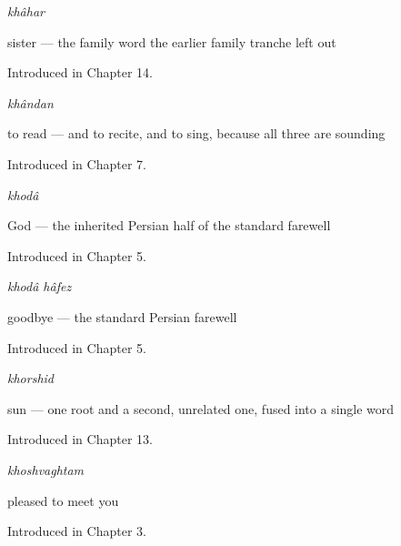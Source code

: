 \noindent\begin{minipage}[t]{\linewidth}
\raggedright
\textbf{}\enspace\emph{khâhar}\par
\small sister — the family word the earlier family tranche left out\par
\footnotesize Introduced in Chapter 14.
\end{minipage}\par\medskip

\noindent\begin{minipage}[t]{\linewidth}
\raggedright
\textbf{}\enspace\emph{khândan}\par
\small to read — and to recite, and to sing, because all three are sounding\par
\footnotesize Introduced in Chapter 7.
\end{minipage}\par\medskip

\noindent\begin{minipage}[t]{\linewidth}
\raggedright
\textbf{}\enspace\emph{khodâ}\par
\small God — the inherited Persian half of the standard farewell\par
\footnotesize Introduced in Chapter 5.
\end{minipage}\par\medskip

\noindent\begin{minipage}[t]{\linewidth}
\raggedright
\textbf{}\enspace\emph{khodâ hâfez}\par
\small goodbye — the standard Persian farewell\par
\footnotesize Introduced in Chapter 5.
\end{minipage}\par\medskip

\noindent\begin{minipage}[t]{\linewidth}
\raggedright
\textbf{}\enspace\emph{khorshid}\par
\small sun — one root and a second, unrelated one, fused into a single word\par
\footnotesize Introduced in Chapter 13.
\end{minipage}\par\medskip

\noindent\begin{minipage}[t]{\linewidth}
\raggedright
\textbf{}\enspace\emph{khoshvaghtam}\par
\small pleased to meet you\par
\footnotesize Introduced in Chapter 3.
\end{minipage}\par\medskip

